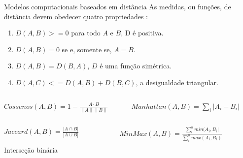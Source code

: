 \begin{frame}{Modelos computacionais baseados em distância}
\selectFont
	As medidas, ou funções, de distância devem obedecer quatro propriedades \cite{deza2009encyclopedia}:
	\begin{enumerate}\selectFont
		\item $D(A,B) >= 0 $ para todo $A$ e $B$, D é positiva.
		\item $D(A,B) = 0 $ se e, somente se, $A = B$.
		\item $D(A,B) = D(B,A) $, $D$ é uma função simétrica.
		\item $D(A, C) <= D(A, B) + D(B, C)$, a desigualdade triangular.
	\end{enumerate}


	\begin{columns}
	\begin{column}{0.48\textwidth}
		\begin{tcolorbox}[colback=red!5!white,colframe=red!75!black,title=Distância de cosseno,height=2cm,valign=center]\selectFont
			$
			Cossenos \left ( A,B \right ) = 1 -\frac{A\cdot B}{\left \| A \right \| \left \| B \right \|}
			$            
		\end{tcolorbox}
	\end{column}
	\begin{column}{0.48\textwidth}\selectFont
		\begin{tcolorbox}[title=Manhattan,height=2cm,valign=center]\selectFont
			$
			Manhattan \left ( A,B \right )= \sum_i {\left| A_i - B_i \right|}
			 $     
	\end{tcolorbox}
	\end{column}
	\end{columns}


	\begin{columns}
		\begin{column}{0.48\textwidth}
			\begin{tcolorbox}[colback=blue!5!white,colframe=blue!75!black,title=Jaccard,height=2cm,valign=center]\selectFont
			$
			Jaccard(A,B) = \frac{\left | A \cap B \right |}{\left | A \cup B \right |}
			$
			
			Interseção binária
			\end{tcolorbox}
		\end{column}
		\begin{column}{0.48\textwidth}\selectFont
			\begin{tcolorbox}[title={MinMax, ou Jaccard generalizado},height=2cm,valign=center]\selectFont
				$
				MinMax (A,B) = \frac{ \sum_{i}^{n}{ min(A_i,B_i|}}{\sum_{i}^{n}{max(A_i,B_i)}}
				$      
			\end{tcolorbox}
		\end{column}
	\end{columns}

\end{frame}


